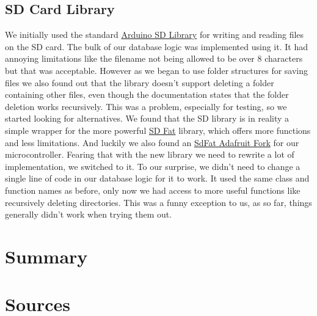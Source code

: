 \documentclass{article}
\begin{document}
\subsection{SD Card Library}
We initially used the standard \href{https://github.com/arduino-libraries/SD}{Arduino SD Library} for writing and reading files on the SD card. The bulk of our database logic was implemented using it.
It had annoying limitations like the filename not being allowed to be over 8 characters but that was acceptable.
However as we began to use folder structures for saving files we also found out that the library doesn't support deleting a folder containing other files, even though the documentation states that the folder deletion works recursively.
This was a problem, especially for testing, so we started looking for alternatives. We found that the SD library is in reality a simple wrapper for the more powerful \href{https://github.com/greiman/SdFat}{SD Fat} library, which offers more functions and less limitations.
And luckily we also found an \href{https://github.com/adafruit/SdFat}{SdFat Adafruit Fork} for our microcontroller. Fearing that with the new library we need to rewrite a lot of implementation, we switched to it.
To our surprise, we didn't need to change a single line of code in our database logic for it to work. It used the same class and function names as before, only now we had access to more useful functions like recursively deleting directories.
This was a funny exception to us, as so far, things generally didn't work when trying them out.
\section{Summary}

\section{Sources}





\end{document}
